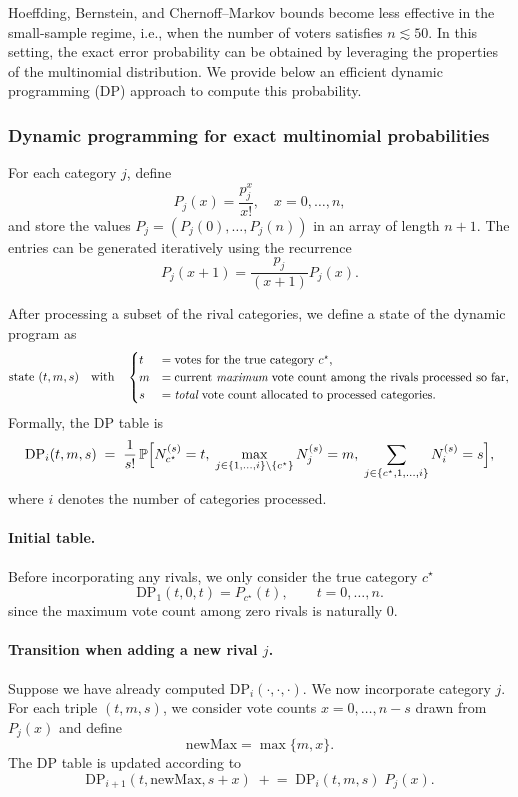 Hoeffding, Bernstein, and Chernoff–Markov bounds become less effective in the small-sample regime, i.e., when the number of voters satisfies $n\lesssim 50$. In this setting, the exact error probability can be obtained by leveraging the properties of the  multinomial distribution.
We provide below an efficient dynamic programming (DP) approach to compute this probability.


\subsubsection{Dynamic programming for exact multinomial probabilities}\label{app:subsubsec_dynamic_programming}
For each category $j$, define 
$$
P_j(x) =\frac{p_j^{x}}{x!} , \quad x = 0, \dots, n,
$$
and store the values $P_j= (P_j(0),\dots, P_j(n))$ in an array of length $n+1$.
The entries can be generated iteratively using the recurrence 
$$P_j(x+1) = \frac{p_j}{(x+1)}P_j(x).$$

After processing a subset of the rival categories, we define a state of the dynamic program as
$$
  \text{state }(t,m,s)\quad
  \text{with}\quad
  \begin{cases}
     t &=\text{votes for the true category }c^\star,\\
     m &=\text{current {\it maximum} vote count among the rivals processed so far,}\\
    s &=\text{{\it total} vote count allocated to processed categories.}
  \end{cases}
$$
Formally, the DP table is
$$
  \text{DP}_{i}(t,m,s)
  \;=\;\frac{1}{s!}\,
  \mathbb{P}\Bigl[N_{c^\star}^{(s)}=t,\;
           \max_{j\in\{1,\dots,i\}\setminus\{c^\star\}}N_j^{(s)} = m, \; \sum_{j\in\{c^\star, 1, \dots, i\}}N_i^{(s)} =s\Bigr],
$$
where $i$ denotes the number of categories processed.

\paragraph{Initial table.}
Before incorporating any rivals, we only consider the true category $c^\star$
$$
  \text{DP}_{1}(t,0,t)=P_{c^\star}(t),\qquad
  t=0,\dots,n.
$$
since the maximum vote count among zero rivals is naturally $0$.

\paragraph{Transition when adding a new rival $j$.}
Suppose we have already computed $\text{DP}_{i}(\cdot,\cdot, \cdot)$. 
We now incorporate category $j$.
For each triple $(t, m, s)$, we consider vote counts  $x=0,\dots,n-s$ drawn from $P_j(x)$ and define
$$
  \text{newMax}=\max\{m,x\}.
$$
The DP table is updated according to
$$
  \text{DP}_{i+1}(t,\text{newMax}, s+x)
  \;+\!=\;
  \text{DP}_{i}(t,m,s)\;P_j(x).
$$

